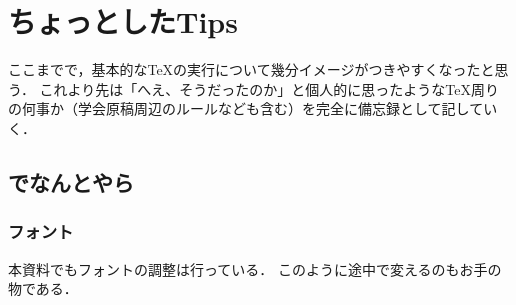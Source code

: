 \documentclass[./main]{subfiles}
\begin{document}
\section{ちょっとしたTips}
\noindent
ここまでで，基本的な\TeX の実行について幾分イメージがつきやすくなったと思う．
これより先は「へえ、そうだったのか」と個人的に思ったような\TeX 周りの何事か（学会原稿周辺のルールなども含む）を完全に備忘録として記していく．

\subsection{\LuaLaTeX でなんとやら}
\subsubsection{フォント}
本資料でもフォントの調整は行っている．
このように途中で変えるのもお手の物である．


\ifSubfilesClassLoaded{%
  \printbibliography
}%
\end{document}
